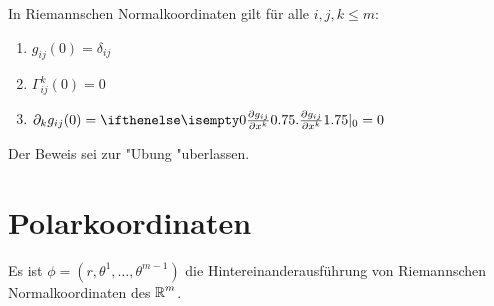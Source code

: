\begin{Prop}
In Riemannschen Normalkoordinaten gilt für alle $i,j,k \leq m$:
\begin{enumerate}[label=(\roman*)]
\item
	$g_{ij}(0) = \delta_{ij}$
\item
	$\Gamma^k_{ij}(0) = 0$
\item
	$\partial_k g_{ij}(0) = \pdifffrac[0]{g_{ij}}{x^k} = 0$
\end{enumerate}\end{Prop}

Der Beweis sei zur "Ubung "uberlassen.

\section{Polarkoordinaten}

Es ist $\phi = (r, \theta^1, \ldots, \theta^{m-1})$ die Hintereinanderausführung von Riemannschen Normalkoordinaten des $\operatorname{\mathbb{R}}^m$.

